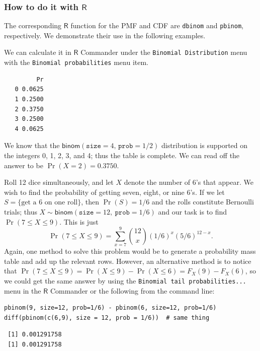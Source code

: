 \documentclass[captions=tableheading]{scrbook}
\begin{document}
\subsubsection{How to do it with \(\mathsf{R}\)}
\label{sec-5-3-1-1}


The corresponding \(\mathsf{R}\) function for the PMF and CDF are \texttt{dbinom} and \texttt{pbinom}, respectively. We demonstrate their use in the following examples.  

\begin{example}
We can calculate it in \(\mathsf{R}\) Commander under the \texttt{Binomial Distribution} menu with the \texttt{Binomial probabilities} menu item.


\begin{verbatim}
         Pr
   0 0.0625
   1 0.2500
   2 0.3750
   3 0.2500
   4 0.0625
\end{verbatim}

\end{example}

We know that the \(\mathsf{binom}(\mathtt{size}=4,\,\mathtt{prob}=1/2)\) distribution is supported on the integers 0, 1, 2, 3, and 4; thus the table is complete. We can read off the answer to be \(\Pr(X=2)=0.3750\).

\begin{example}
Roll 12 dice simultaneously, and let \(X\) denote the number of 6's that appear. We wish to find the probability of getting seven, eight, or nine 6's. If we let \(S=\{ \mbox{get a 6 on one roll} \} \), then \(\Pr(S)=1/6\) and the rolls constitute Bernoulli trials; thus \(X\sim\mathsf{binom}(\mathtt{size}=12,\ \mathtt{prob}=1/6)\) and our task is to find \(\Pr(7\leq X\leq9)\). This is just
\[ 
\Pr(7\leq X\leq9)=\sum_{x=7}^{9}{12 \choose x}(1/6)^{x}(5/6)^{12-x}.
\]
Again, one method to solve this problem would be to generate a probability mass table and add up the relevant rows. However, an alternative method is to notice that \(\Pr(7\leq X\leq9)=\Pr(X\leq9)-\Pr(X\leq6)=F_{X}(9)-F_{X}(6)\), so we could get the same answer by using the \texttt{Binomial tail probabilities...} menu in the \(\mathsf{R}\) Commander or the following from the command line: 


\begin{verbatim}
pbinom(9, size=12, prob=1/6) - pbinom(6, size=12, prob=1/6)
diff(pbinom(c(6,9), size = 12, prob = 1/6))  # same thing
\end{verbatim}

\begin{verbatim}
 [1] 0.001291758
 [1] 0.001291758
\end{verbatim}

\end{example}
\end{document}
